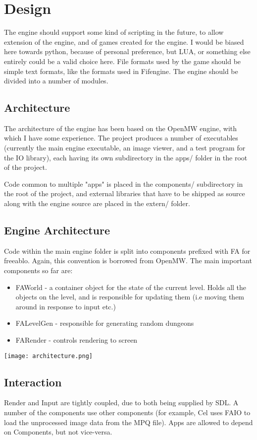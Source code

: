   \chapter{Design}
    The engine should support some kind of scripting in the future, to allow extension of the engine, and of games created for the engine. I would be biased here towards python, because of personal preference, but LUA, or something else entirely could be a valid choice here.
    File formats used by the game should be simple text formats, like the formats used in Fifengine.
    The engine should be divided into a number of modules.
    
    \section{Architecture}
    The architecture of the engine has been based on the OpenMW\cite{openmw} engine, with which I have some experience.
    The project produces a number of executables (currently the main engine executable, an image viewer, and a test program for the IO library), each having its own subdirectory in the apps/ folder in the root of the project.
    
    Code common to multiple "apps" is placed in the components/ subdirectory in the root of the project, and external libraries that have to be shipped as source along with the engine source are placed in the extern/ folder.
    
    \section{Engine Architecture}
    Code within the main engine folder is split into components prefixed with FA for freeablo. Again, this convention is borrowed from OpenMW\cite{openmw}.
    The main important components so far are:
    \begin{itemize}
        \item{FAWorld - a container object for the state of the current level. Holds all the objects on the level, and is responsible for updating them (i.e moving them around in response to input etc.)}
        \item{FALevelGen - responsible for generating random dungeons}
        \item{FARender - controls rendering to screen}
    \end{itemize}

	\begin{center}\texttt{[image: architecture.png]}\end{center}
	
	\section{Interaction}
	Render and Input are tightly coupled, due to both being supplied by SDL.
	A number of the components use other components (for example, Cel uses FAIO to load the unprocessed image data from the MPQ file).
	Apps are allowed to depend on Components, but not vice-versa.